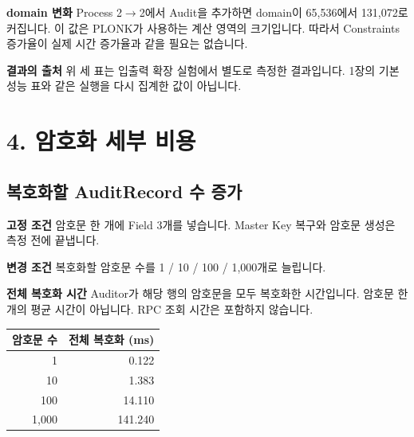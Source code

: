 \documentclass[11pt,a4paper]{article}
\begin{document}
\textbf{domain 변화}\newline
Process 2$\rightarrow$2에서 Audit을 추가하면 domain이 65,536에서 131,072로 커집니다.\newline
이 값은 PLONK가 사용하는 계산 영역의 크기입니다.\newline
따라서 Constraints 증가율이 실제 시간 증가율과 같을 필요는 없습니다.\par\smallskip
\textbf{결과의 출처}\newline
위 세 표는 입출력 확장 실험에서 별도로 측정한 결과입니다.\newline
1장의 기본 성능 표와 같은 실행을 다시 집계한 값이 아닙니다.

\section*{4. 암호화 세부 비용}
\par\noindent\begin{minipage}{\linewidth}
\subsection*{복호화할 AuditRecord 수 증가}
\textbf{고정 조건}\newline
암호문 한 개에 Field 3개를 넣습니다.\newline
Master Key 복구와 암호문 생성은 측정 전에 끝냅니다.\par\smallskip
\textbf{변경 조건}\newline
복호화할 암호문 수를 1 / 10 / 100 / 1,000개로 늘립니다.\par\smallskip
\textbf{전체 복호화 시간}\newline
Auditor가 해당 행의 암호문을 모두 복호화한 시간입니다.\newline
암호문 한 개의 평균 시간이 아닙니다.\newline
RPC 조회 시간은 포함하지 않습니다.\par\smallskip
\begin{center}\small\begin{tabular}{@{}rr@{}}\toprule
\textbf{암호문 수} & \textbf{전체 복호화 (ms)} \\
\midrule
1 & 0.122 \\
10 & 1.383 \\
100 & 14.110 \\
1,000 & 141.240 \\
\bottomrule\end{tabular}\end{center}
\end{minipage}\par\medskip
\end{document}
